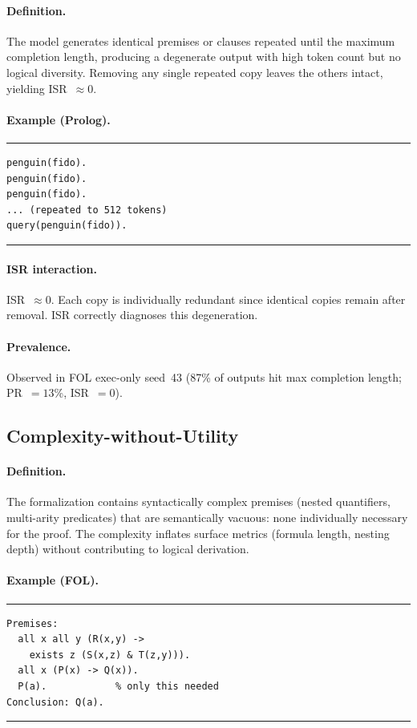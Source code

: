 \paragraph{Definition.}
The model generates identical premises or clauses repeated until the maximum completion length, producing a degenerate output with high token count but no logical diversity.
Removing any single repeated copy leaves the others intact, yielding ISR~$\approx 0$.

\paragraph{Example (Prolog).}
\smallskip\noindent\rule{\columnwidth}{0.3pt}
\begin{verbatim}
penguin(fido).
penguin(fido).
penguin(fido).
... (repeated to 512 tokens)
query(penguin(fido)).
\end{verbatim}
\noindent\rule{\columnwidth}{0.3pt}\smallskip

\paragraph{ISR interaction.}
ISR~$\approx 0$. Each copy is individually redundant since identical copies remain after removal.
ISR correctly diagnoses this degeneration.

\paragraph{Prevalence.}
Observed in FOL exec-only seed~43 (87\% of outputs hit max completion length; PR~$=13$\%, ISR~$=0$).


\subsection{Complexity-without-Utility}

\paragraph{Definition.}
The formalization contains syntactically complex premises (nested quantifiers, multi-arity predicates) that are semantically vacuous: none individually necessary for the proof.
The complexity inflates surface metrics (formula length, nesting depth) without contributing to logical derivation.

\paragraph{Example (FOL).}
\smallskip\noindent\rule{\columnwidth}{0.3pt}
{\small\begin{verbatim}
Premises:
  all x all y (R(x,y) ->
    exists z (S(x,z) & T(z,y))).
  all x (P(x) -> Q(x)).
  P(a).            % only this needed
Conclusion: Q(a).
\end{verbatim}}
\noindent\rule{\columnwidth}{0.3pt}\smallskip

